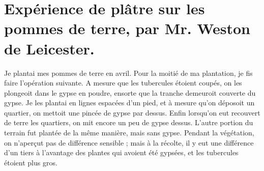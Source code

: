 \section{Expérience de plâtre sur les pommes de terre, par Mr. Weston de Leicester.}
Je plantai mes pommes de terre en avril.
Pour la moitié de ma plantation, je fis faire
l'opération suivante. A mesure que les tubercules étoient coupés, on les plongeoit
dans le gypse en poudre, ensorte que la
tranche demeuroit couverte du gypse. Je les
plantai en lignes espacées d'un pied, et à
mesure qu'on déposoit un quartier, on mettoit une pincée de gypse par dessus. Enfin\setcounter{page}{279} lorsqu'on eut recouvert de terre les quartiers, on mit encore un peu de gypse dessus.
L'autre portion du terrain fut plantée de la même manière, mais sans gypse. Pendant la végétation, on n'aperçut pas de différence sensible ; mais à la récolte, il y eut une différence d'un tiers à l'avantage des plantes qui avoient été gypsées, et les tubercules étoient plus gros.
